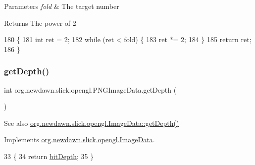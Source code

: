 \begin{DoxyParams}{Parameters}
{\em fold} & The target number \\
\hline
\end{DoxyParams}
\begin{DoxyReturn}{Returns}
The power of 2 
\end{DoxyReturn}

\begin{DoxyCode}
180                                    \{
181         \textcolor{keywordtype}{int} ret = 2;
182         \textcolor{keywordflow}{while} (ret < fold) \{
183             ret *= 2;
184         \}
185         \textcolor{keywordflow}{return} ret;
186     \}
\end{DoxyCode}
\mbox{\label{classorg_1_1newdawn_1_1slick_1_1opengl_1_1_p_n_g_image_data_ae49f5e4da41bec192c7155e01805343c}} 
\subsubsection{\texorpdfstring{get\+Depth()}{getDepth()}}
{\footnotesize\ttfamily int org.\+newdawn.\+slick.\+opengl.\+P\+N\+G\+Image\+Data.\+get\+Depth (\begin{DoxyParamCaption}{ }\end{DoxyParamCaption})\hspace{0.3cm}{\ttfamily [inline]}}

\begin{DoxySeeAlso}{See also}
\mbox{\hyperlink{interfaceorg_1_1newdawn_1_1slick_1_1opengl_1_1_image_data_a69be40348e05222e8f0c65f5845adcb9}{org.\+newdawn.\+slick.\+opengl.\+Image\+Data\+::get\+Depth()}} 
\end{DoxySeeAlso}


Implements \mbox{\hyperlink{interfaceorg_1_1newdawn_1_1slick_1_1opengl_1_1_image_data_a69be40348e05222e8f0c65f5845adcb9}{org.\+newdawn.\+slick.\+opengl.\+Image\+Data}}.


\begin{DoxyCode}
33                           \{
34         \textcolor{keywordflow}{return} \mbox{\hyperlink{classorg_1_1newdawn_1_1slick_1_1opengl_1_1_p_n_g_image_data_adcf8b9e32837d9853842349385a37c22}{bitDepth}};
35     \}
\end{DoxyCode}
\mbox{\label{classorg_1_1newdawn_1_1slick_1_1opengl_1_1_p_n_g_image_data_a9d1cd9b5b83fed3b02f07413e026ecc9}} 
